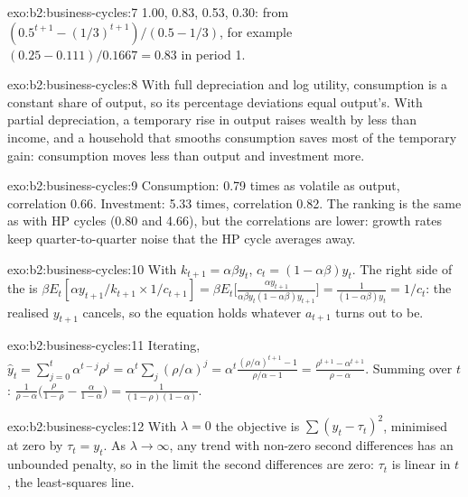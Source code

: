 \begin{solution}{exo:b2:business-cycles:7}
1.00, 0.83, 0.53, 0.30: from $(0.5^{t+1} - (1/3)^{t+1})/(0.5 - 1/3)$, for example $(0.25 - 0.111)/0.1667 = 0.83$ in period 1.
\end{solution}

\begin{solution}{exo:b2:business-cycles:8}
With full depreciation and log utility, consumption is a constant share of output, so its percentage deviations equal
output's. With partial depreciation, a temporary rise in output raises wealth by less than income, and a household that
smooths consumption saves most of the temporary gain: consumption moves less than output and investment more.
\end{solution}

\begin{solution}{exo:b2:business-cycles:9}
Consumption: 0.79 times as volatile as output, correlation 0.66. Investment: 5.33 times, correlation 0.82. The ranking is the same as with HP cycles
(0.80 and 4.66), but the correlations are lower: growth rates keep quarter-to-quarter noise that the HP cycle averages away.
\end{solution}

\begin{solution}{exo:b2:business-cycles:10}
With $k_{t+1} = \alpha\beta y_t$, $c_t = (1 - \alpha\beta)y_t$. The right side of the  is $\beta E_t[\alpha y_{t+1}/k_{t+1} \times 1/c_{t+1}] = \beta E_t\bigl[\frac{\alpha y_{t+1}}{\alpha\beta y_t(1 - \alpha\beta)y_{t+1}}\bigr] = \frac{1}{(1 - \alpha\beta)y_t} = 1/c_t$: the
realised $y_{t+1}$ cancels, so the equation holds whatever $a_{t+1}$ turns out to be.
\end{solution}

\begin{solution}{exo:b2:business-cycles:11}
Iterating, $\hat y_t = \sum_{j=0}^{t}\alpha^{t-j}\rho^j = \alpha^t\sum_j(\rho/\alpha)^j = \alpha^t\frac{(\rho/\alpha)^{t+1} - 1}{\rho/\alpha - 1} = \frac{\rho^{t+1} - \alpha^{t+1}}{\rho - \alpha}$. Summing over $t$: $\frac{1}{\rho - \alpha}\bigl(\frac{\rho}{1 - \rho} - \frac{\alpha}{1 - \alpha}\bigr) = \frac{1}{(1 - \rho)(1 - \alpha)}$.
\end{solution}

\begin{solution}{exo:b2:business-cycles:12}
With $\lambda = 0$ the objective is $\sum(y_t - \tau_t)^2$, minimised at zero by $\tau_t = y_t$. As $\lambda \to \infty$, any trend with non-zero second differences has an unbounded penalty, so in
the limit the second differences are zero: $\tau_t$ is linear in $t$, the least-squares line.
\end{solution}

